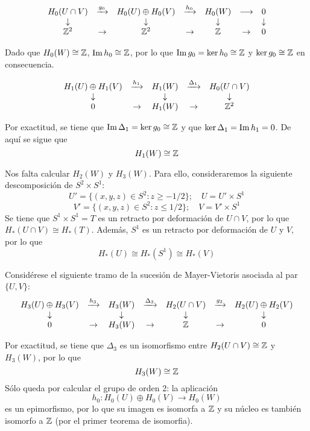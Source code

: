 \[\begin{array}{ccccccc}
H_0(U\cap V)&\xrightarrow{g_0}&H_0(U)\oplus H_0(V)	&\xrightarrow{h_0}	&H_0(W)&\longrightarrow &0\\
\downarrow&					&\downarrow			&					&\downarrow & &\downarrow\\
\mathbb{Z}^2& \rightarrow&\mathbb{Z}^2			&\rightarrow			&\mathbb{Z} & \rightarrow & 0		
\end{array}\]

Dado que $H_0(W)\cong \mathbb{Z}$, $\operatorname{Im} h_0\cong \mathbb{Z}$, por lo que $\operatorname{Im} g_0=\ker h_0\cong \mathbb{Z}$ y $\ker g_0\cong \mathbb{Z}$ en consecuencia. 

\[\begin{array}{ccccccc}
H_1(U)\oplus H_1(V)	&\xrightarrow{h_1}	&H_1(W)		&\xrightarrow{\Delta_1}&H_0(U \cap V)\\
\downarrow			&					&\downarrow	&					&\downarrow\\
0			&\rightarrow			&H_1(W)		&\rightarrow			&\mathbb{Z}^2
\end{array}\]

Por exactitud, se tiene que $\operatorname{Im} \Delta_1=\ker g_0\cong \mathbb{Z}$ y que $\ker \Delta_1=\operatorname{Im} h_1=0$. De aquí se sigue que $$H_1(W)\cong \mathbb{Z}$$

Nos falta calcular $H_2(W)$ y $H_3(W)$. Para ello, consideraremos la siguiente descomposición de $S^2\times S^1$: \[U'=\{(x,y,z) \in S^2: z \geq -1/2\}; \quad U=U'\times S^1\] \[V'=\{(x,y,z) \in S^2: z \leq 1/2\}; \quad V=V'\times S^1\] Se tiene que $S^1\times S^1=T$ es un retracto por deformación de $U\cap V$, por lo que $H_*(U\cap V) \cong H_*(T)$. Además, $S^1$ es un retracto por deformación de $U$ y $V$, por lo que \[H_*(U) \cong H_*(S^1) \cong H_*(V)\]

Considérese el siguiente tramo de la sucesión de Mayer-Vietoris asociada al par $\{U,V\}$: \[\begin{array}{ccccccc}
H_3(U)\oplus H_3(V)	&\xrightarrow{h_3}	&H_3(W)		&\xrightarrow{\Delta_3}&H_2(U \cap V)&\xrightarrow{g_3}&H_2(U)\oplus H_2(V)\\
\downarrow			&					&\downarrow	&					&\downarrow & & \downarrow\\
0			&\rightarrow			&H_3(W)		&\rightarrow			&\mathbb{Z} & \rightarrow & 0
\end{array}\]

Por exactitud, se tiene que $\Delta_3$ es un isomorfismo entre $H_2(U\cap V) \cong \mathbb{Z}$ y $H_3(W)$, por lo que \[H_3(W)\cong \mathbb{Z}\] Sólo queda por calcular el grupo de orden 2: la aplicación $$h_0: H_0(U) \oplus H_0(V) \longrightarrow H_0(W)$$ es un epimorfismo, por lo que su imagen es isomorfa a $\mathbb{Z}$ y su núcleo es también isomorfo a $\mathbb{Z}$ (por el primer teorema de isomorfia).


